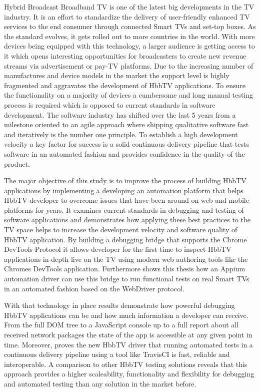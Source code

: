 Hybrid Broadcast Broadband TV is one of the latest big developments in the TV industry. It is
an effort to standardize the delivery of user-friendly enhanced TV services to the end consumer
through connected Smart TVs and set-top boxes. As the standard evolves, it gets rolled out to
more countries in the world. With more devices being equipped with this technology, a larger
audience is getting access to it which opens interesting opportunities for broadcasters to
create new revenue streams via advertisement or pay-TV platforms. Due to the increasing number
of manufactures and device models in the market the support level is highly fragmented and
aggravates the development of HbbTV applications. To ensure the functionality on a majority of
devices a cumbersome and long manual testing process is required which is opposed to current
standards in software development. The software industry has shifted over the last 5 years
from a milestone oriented to an agile approach where shipping qualitative software fast and
iteratively is the number one principle. To establish a high development velocity a key
factor for success is a solid continuous delivery pipeline that tests software in an automated
fashion and provides confidence in the quality of the product.

The major objective of this study is to improve the process of building HbbTV applications
by implementing a developing an automation platform that helps HbbTV developer to overcome
issues that have been around on web and mobile platforms for years. It examines current
standards in debugging and testing of software applications and demonstrates how applying
these best practices to the TV space helps to increase the development velocity and software
quality of HbbTV application. By building a debugging bridge that supports the Chrome DevTools
Protocol it allows developer for the first time to inspect HbbTV applications in-depth live on
the TV using modern web authoring tools like the Chromes DevTools application. Furthermore
shows this thesis how an Appium automation driver can use this bridge to run functional tests
on real Smart TVs in an automated fashion based on the WebDriver protocol.

With that technology in place results demonstrate how powerful debugging HbbTV applications
can be and how much information a developer can receive. From the full DOM tree to a JavaScript
console up to a full report about all received network packages the state of the app is
accessible at any given point in time. Moreover, proves the new HbbTV driver that running
automated tests in a continuous delivery pipeline using a tool like TravisCI is fast,
reliable and interoperable. A comparison to other HbbTV testing solutions reveals that this
approach provides a higher scaleability, functionality and flexibility for debugging and
automated testing than any solution in the market before.
